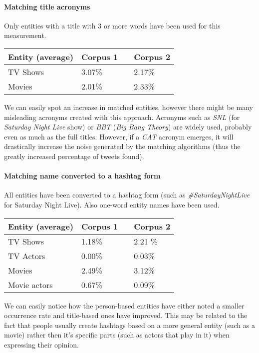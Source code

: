 \paragraph{Matching title acronyms}
Only entities with a title with 3 or more words have been used for this measurement.

\begin{center}
  \begin{tabular}{ | p{4cm} | p{2cm} | p{1cm}| p{2cm} | } \hline
    Entity (average) & Corpus 1 & & Corpus 2 \\ \hline
    TV Shows & 3.07\% & & 2.17\% \\ \hline
    Movies & 2.01\% & & 2.33\% \\ \hline
  \end{tabular}
\end{center}

We can easily spot an increase in matched entities, however there might be many
misleading acronyms created with this approach. Acronyms such as \textit{SNL}
(for \textit{Saturday Night Live} show) or  \textit{BBT} (\textit{Big Bang
Theory}) are widely used, probably even as much as the full titles. However,
if a \textit{CAT} acronym emerges, it will drastically increase the noise generated
by the matching algorithms (thus the greatly increased percentage of tweets found).

\paragraph{Matching name converted to a hashtag form}
All entities have been converted to a hashtag form (such as
\textit{\#SaturdayNightLive} for Saturday Night Live). Also one-word entity
names have been used.

\begin{center}
  \begin{tabular}{ | p{4cm} | p{2cm} | p{1cm}| p{2cm} | } \hline
    Entity (average) & Corpus 1 & & Corpus 2 \\ \hline
    TV Shows & 1.18\% & & 2.21 \% \\ \hline
    TV Actors & 0.00\% & & 0.03\% \\ \hline
    Movies & 2.49\% & & 3.12\% \\ \hline
    Movie actors & 0.67\% & & 0.09\% \\ \hline
  \end{tabular}
\end{center}

We can easily notice how the person-based entities have either noted a smaller
occurrence rate and title-based ones have improved. This may be related to the
fact that people usually create hashtags based on a more general entity (such as
a movie) rather then it's specific parts (such as actors that play in it)
when expressing their opinion.

